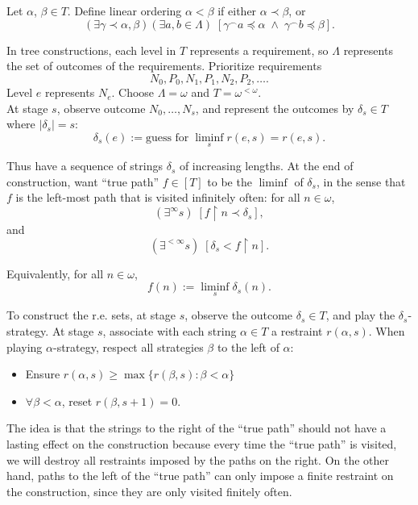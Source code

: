   \begin{definition}
    Let $\alpha$, $\beta\in T$. Define linear ordering $\alpha<\beta$
    if either $\alpha \prec \beta$, or
    \[(\exists \gamma \prec \alpha, \beta) (\exists a,b \in \Lambda)\;
    [\gamma^\frown a \preceq\alpha\; \wedge\; \gamma^\frown b
    \preceq\beta].\]
  \end{definition}

  In tree constructions, each level in $T$ represents a requirement, so
  $\Lambda$ represents the set of outcomes of the requirements. Prioritize
  requirements
  \[N_0, P_0, N_1, P_1, N_2, P_2, \ldots.\]
  Level $e$ represents $N_e$. Choose $\Lambda=\omega$ and
  $T=\omega^{<\omega}$. \\

  At stage $s$, observe outcome $N_0,\ldots,N_s$, and represent the
  outcomes by $\delta_s\in T$ where $|\delta_s|=s$:
  \[\delta_s(e) :=\text{guess for}\; \liminf_s r(e,s) =r(e,s).\]
  
  Thus have a sequence of strings $\delta_s$ of increasing lengths. At the
  end of construction, want ``true path'' $f\in[T]$ to be the $\liminf$ of
  $\delta_s$, in the sense that $f$ is the left-most path that is visited
  infinitely often: for all $n\in\omega$,
  \[(\exists^\infty s)\; [f\restriction n \prec
  \delta_s],\]
  and
  \[(\exists^{<\infty} s)\; [\delta_s < f\restriction n].\]

  Equivalently, for all $n\in\omega$,
  \[f(n) :=\liminf_s \delta_s(n).\]

  To construct the r.e. sets, at stage $s$, observe the outcome
  $\delta_s\in T$, and play the $\delta_s$-strategy. At stage $s$,
  associate with each string $\alpha\in T$ a restraint $r(\alpha,s)$.
  When playing $\alpha$-strategy, respect all strategies $\beta$ to the
  left of $\alpha$:
  \begin{itemize}
    \item Ensure $r(\alpha,s) \geq \max\{r(\beta,s): \beta<\alpha\}$
    \item $\forall\beta<\alpha$, reset $r(\beta,s+1)=0$.
  \end{itemize}

  The idea is that the strings to the right of the ``true path'' should not
  have a lasting effect on the construction because every time the ``true
  path'' is visited, we will destroy all restraints imposed by the paths on
  the right. On the other hand, paths to the left of the ``true path'' can
  only impose a finite restraint on the construction, since they are only
  visited finitely often. \\

